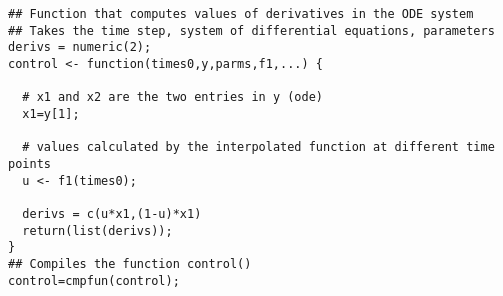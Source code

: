 \documentclass[12pt, oneside]{article}   	%
\begin{document}
\begin{lstlisting}
## Function that computes values of derivatives in the ODE system
## Takes the time step, system of differential equations, parameters
derivs = numeric(2); 
control <- function(times0,y,parms,f1,...) {
  
  # x1 and x2 are the two entries in y (ode)
  x1=y[1]; 
  
  # values calculated by the interpolated function at different time points
  u <- f1(times0);
  
  derivs = c(u*x1,(1-u)*x1) 
  return(list(derivs));
}
## Compiles the function control()
control=cmpfun(control); 
\end{lstlisting}

\clearpage
\nocite{*}

 

\end{document}
